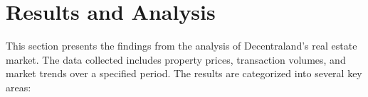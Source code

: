 \section{Results and Analysis}
This section presents the findings from the analysis of Decentraland's real estate market. The data collected includes property prices, transaction volumes, and market trends over a specified period. The results are categorized into several key areas: